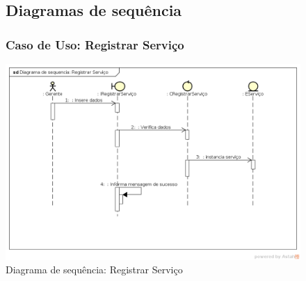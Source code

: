 \documentclass[
	12pt,				%
	openright,
	oneside,			%
	a4paper,			%
	chapter=TITLE,		%
	brazil				%
	]{abntex2}
\begin{document}

\begin{figure}[h!]

\subsection{Diagramas de sequência}



\subsubsection*{Caso de Uso: Registrar Serviço}

	\caption{Diagrama de sequência: Registrar Serviço}
	\begin{center}
	    \includegraphics[scale=0.5]{Arquivos/Analise/D_registrar_servico}  
	\end{center}
\end{figure}
\end{document}
